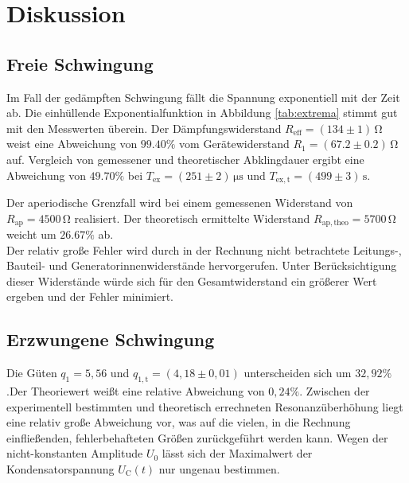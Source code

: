\section{Diskussion}
\label{sec:Diskussion}
\subsection{Freie Schwingung}
Im Fall der gedämpften Schwingung fällt die Spannung exponentiell mit der Zeit ab. 
Die einhüllende Exponentialfunktion in Abbildung \ref{tab:extrema} stimmt gut mit den Messwerten überein. 
Der Dämpfungswiderstand $R_\mathup{eff}=(134\pm1)\,\si{\ohm}$ weist eine Abweichung von $99.40\%$ vom Gerätewiderstand $R_1=(67.2\pm0.2)\,\si{\ohm}$ auf.
Vergleich von gemessener und theoretischer Abklingdauer ergibt eine Abweichung von $49.70\%$ bei $T_\mathup{ex}=(251\pm2)\,\si{\micro\second}$ und $T_\mathup{ex,t}=(499\pm3)\,\si\second$. 

Der aperiodische Grenzfall wird bei einem gemessenen Widerstand von $R_\mathup{ap}=4500\,\si\ohm$ realisiert. 
Der theoretisch ermittelte Widerstand $R_\mathup{ap,theo}=5700\,\si\ohm$ weicht um $26.67\%$ ab.\\
Der relativ große Fehler wird durch in der Rechnung nicht betrachtete Leitungs-, Bauteil- und Generatorinnenwiderstände hervorgerufen. 
Unter Berücksichtigung dieser Widerstände würde sich für den Gesamtwiderstand ein größerer Wert ergeben und der Fehler minimiert.

\subsection{Erzwungene Schwingung}
Die Güten $q_1=5,56$ und $q_{1,\mathup{t}}=(4,18\pm0,01)$ unterscheiden sich um $32,92\%$.Der Theoriewert weißt eine relative Abweichung von $0,24\%$.
Zwischen der experimentell bestimmten und theoretisch errechneten Resonanzüberhöhung liegt eine relativ große Abweichung vor, was auf die vielen, in die Rechnung einfließenden, fehlerbehafteten Größen zurückgeführt werden kann. 
Wegen der nicht-konstanten Amplitude $U_0$ lässt sich der Maximalwert der Kondensatorspannung $U_\mathup{C}(t)$ nur ungenau bestimmen. 

